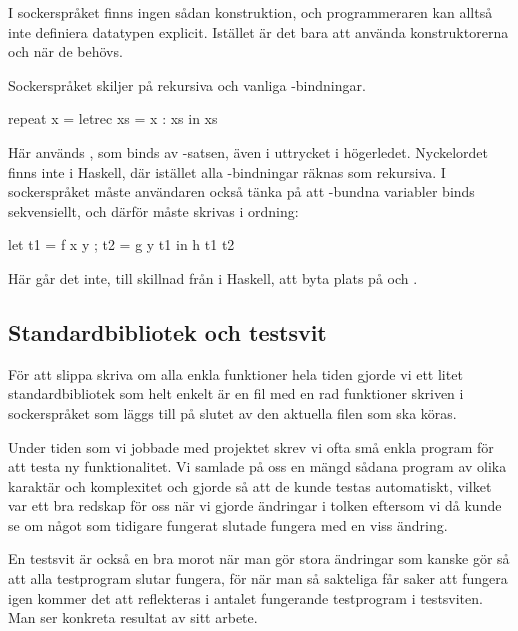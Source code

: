 \documentclass[Rapport]{subfiles}
\begin{document}
I sockerspråket finns ingen sådan konstruktion, och programmeraren kan alltså inte
definiera datatypen explicit. Istället är det bara att använda
konstruktorerna  och  när de behövs.


Sockerspråket skiljer på rekursiva och vanliga -bindningar. 

\begin{codeEx}
repeat x = letrec xs = x : xs in xs  
\end{codeEx}

Här används , som binds av -satsen, även i uttrycket i högerledet.
Nyckelordet  finns inte i Haskell, där istället alla -bindningar räknas som rekursiva. I
sockerspråket måste användaren också tänka på att -bundna variabler binds
sekvensiellt, och därför måste skrivas i ordning:

\begin{codeEx}
let { t1 = f x y
    ; t2 = g y t1
    }
in  h t1 t2
\end{codeEx}

Här går det inte, till skillnad från i Haskell, att byta plats på  och .

\subsection{Standardbibliotek och testsvit}

För att slippa skriva om alla enkla funktioner hela tiden gjorde vi ett litet standardbibliotek
som helt enkelt är en fil med en rad funktioner skriven i sockerspråket som läggs
till på slutet av den aktuella filen som ska köras.

Under tiden som vi jobbade med projektet skrev vi ofta små enkla
program för att testa ny funktionalitet. Vi samlade på oss en mängd sådana program av
olika karaktär och komplexitet och gjorde så att de kunde testas automatiskt, 
vilket var ett bra redskap för oss 
när vi gjorde ändringar i tolken eftersom vi då kunde se om något som tidigare
fungerat slutade fungera med en viss ändring. 

En testsvit är också en bra morot när man gör stora ändringar som kanske gör så att
alla testprogram slutar fungera, för när man så sakteliga får saker att fungera
igen kommer det att reflekteras i antalet fungerande testprogram i testsviten. 
Man ser konkreta resultat av sitt arbete.
\end{document}
